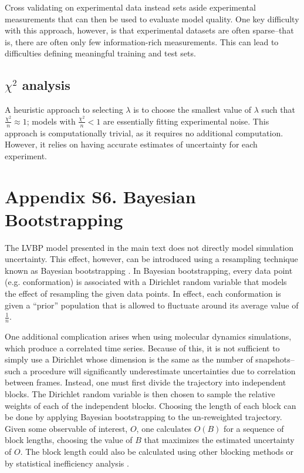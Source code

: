 \documentclass[journal=jacsat,manuscript=article]{achemso}
\begin{document}
Cross validating on experimental data instead sets aside experimental measurements that can then be used to evaluate model quality.  One key difficulty with this approach, however, is that experimental datasets are often sparse--that is, there are often only few information-rich measurements.  This can lead to difficulties defining meaningful training and test sets.  

\subsection{$\chi^2$ analysis}

A heuristic approach to selecting $\lambda$ is to choose the smallest value of $\lambda$ such that $\frac{\chi^2}{n} \approx 1$; models with $\frac{\chi^2}{n} < 1$ are essentially fitting experimental noise.  This approach is computationally trivial, as it requires no additional computation.  However, it relies on having accurate estimates of uncertainty for each experiment.  

\section{Appendix S6.  Bayesian Bootstrapping}

The LVBP model presented in the main text does not directly model simulation uncertainty.  This effect, however, can be introduced using a resampling technique known as Bayesian bootstrapping \cite{rubin1981}.  In Bayesian bootstrapping, every data point (e.g. conformation) is associated with a Dirichlet random variable that models the effect of resampling the given data points.  In effect, each conformation is given a ``prior'' population that is allowed to fluctuate around its average value of $\frac{1}{n}$.  

One additional complication arises when using molecular dynamics simulations, which produce a correlated time series.  Because of this, it is not sufficient to simply use a Dirichlet whose dimension is the same as the number of snapshots--such a procedure will significantly underestimate uncertainties due to correlation between frames.  Instead, one must first divide the trajectory into independent blocks.  The Dirichlet random variable is then chosen to sample the relative weights of each of the independent blocks.  Choosing the length of each block can be done by applying Bayesian bootstrapping to the un-reweighted trajectory.  Given some observable of interest, $O$, one calculates $O(B)$ for a sequence of block lengths, choosing the value of $B$ that maximizes the estimated uncertainty of $O$.  The block length could also be calculated using other blocking methods \cite{flyvbjerg1989error} or by statistical inefficiency analysis \cite{shirts2008}.  
\end{document}
